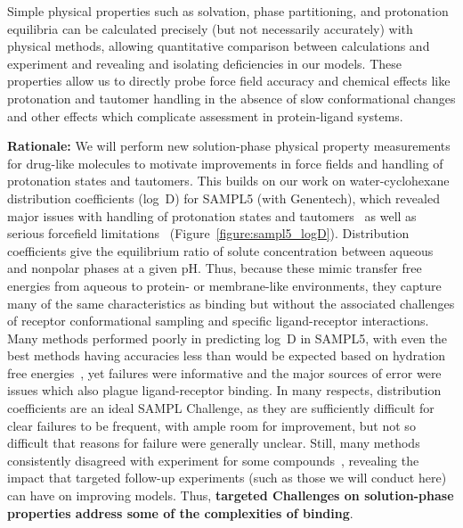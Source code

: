 \documentclass[11pt]{article}
\begin{document}
Simple physical properties such as solvation, phase partitioning, and protonation equilibria can be calculated precisely (but not necessarily accurately) with physical methods, allowing quantitative comparison between calculations and experiment and revealing and isolating deficiencies in our models. 
These properties allow us to directly probe force field accuracy and chemical effects like protonation and tautomer handling in the absence of slow conformational changes and other effects which complicate assessment in protein-ligand systems. 


{\bf Rationale:}
We will perform new solution-phase physical property measurements for drug-like molecules to motivate improvements in force fields and handling of protonation states and tautomers.
This builds on our work on water-cyclohexane distribution coefficients (log~D) for SAMPL5 (with Genentech), which revealed major issues with handling of protonation states and tautomers~\cite{Bannan:2016:JComputAidedMolDes} as well as serious forcefield limitations~\cite{paranahewage_predicting_2016} (Figure~\ref{figure:sampl5_logD}).
Distribution coefficients give the equilibrium ratio of solute concentration between aqueous and nonpolar phases at a given pH.
Thus, because these mimic transfer free energies from aqueous to protein- or membrane-like environments, they capture many of the same characteristics as binding but without the associated challenges of receptor conformational sampling and specific ligand-receptor interactions.
Many methods performed poorly in predicting log~D in SAMPL5, with even the best methods having accuracies less than would be expected based on hydration free energies~\cite{Bannan:2016:JComputAidedMolDes}, yet failures were informative and the major sources of error were issues which also plague ligand-receptor binding.
In many respects, distribution coefficients are an ideal SAMPL Challenge, as they are sufficiently difficult for clear failures to be frequent, with ample room for improvement, but not so difficult that reasons for failure were generally unclear. 
Still, many methods consistently disagreed with experiment for some compounds~\cite{paranahewage_predicting_2016, klamt_prediction_2016, Bannan:2016:JComputAidedMolDes, rustenburg_measuring_2016}, revealing the impact that targeted follow-up experiments (such as those we will conduct here) can have on improving models.
Thus, \textbf{targeted Challenges on solution-phase properties address some of the complexities of binding}.  
\end{document}
